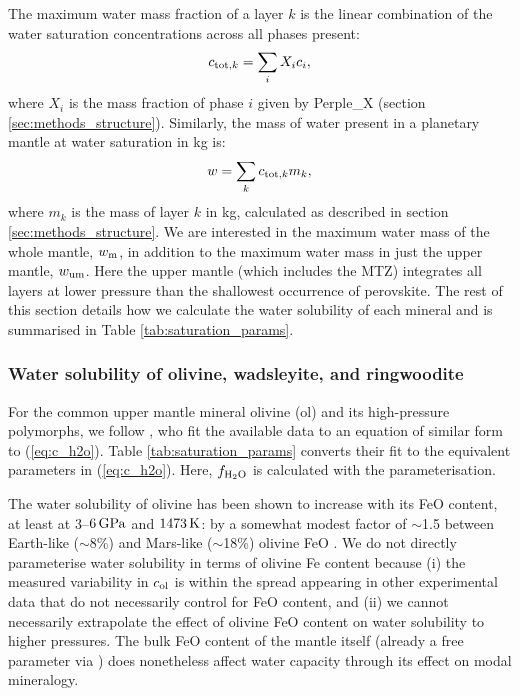 The maximum water mass fraction of a layer $k$ is the linear combination of the water saturation concentrations across all phases present:
\begin{equation}
    c_{{\rm tot}, k} = \sum_i X_i c_i,
\end{equation}
where $X_i$ is the mass fraction of phase $i$ given by Perple\_X (section \ref{sec:methods_structure}). Similarly, the mass of water present in a planetary mantle at water saturation in kg is:
\begin{equation}\label{eq:water_mass}
    w = \sum_k c_{{\rm tot}, k} m_k,
\end{equation}
where $m_k$ is the mass of layer $k$ in kg, calculated as described in section \ref{sec:methods_structure}. We are interested in the maximum water mass of the whole mantle, $w_{\rm m}$, in addition to the maximum water mass in just the upper mantle, $w_{\rm um}$. Here the upper mantle (which includes the MTZ) integrates all layers at lower pressure than the shallowest occurrence of perovskite. The rest of this section details how we calculate the water solubility of each mineral and is summarised in Table \ref{tab:saturation_params}.

\subsubsection{Water solubility of olivine, wadsleyite, and ringwoodite}

For the common upper mantle mineral olivine (ol) and its high-pressure polymorphs, we follow \citet{dong_constraining_2021}, who fit the available data to an equation of similar form to (\ref{eq:c_h2o}). Table \ref{tab:saturation_params} converts their fit to the equivalent parameters in (\ref{eq:c_h2o}). Here, $f_{\rm H_2O}$ is calculated with the \citet{frost_experimental_1997} parameterisation.

The water solubility of olivine has been shown to increase with its FeO content, at least at 3--$6\,{\rm GPa}$ and $1473\,{\rm K}$: by a somewhat modest factor of $\sim$1.5 between Earth-like ($\sim$8\%) and Mars-like ($\sim$18\%) olivine FeO \citep{withers_effect_2011}. We do not directly parameterise water solubility in terms of olivine Fe content because (i) the measured variability in $c_{\rm ol}$ is within the spread appearing in other experimental data that do not necessarily control for FeO content, and (ii) we cannot necessarily extrapolate the effect of olivine FeO content on water solubility to higher pressures. The bulk FeO content of the mantle itself (already a free parameter via \coreeff) does nonetheless affect water capacity through its effect on modal mineralogy.



